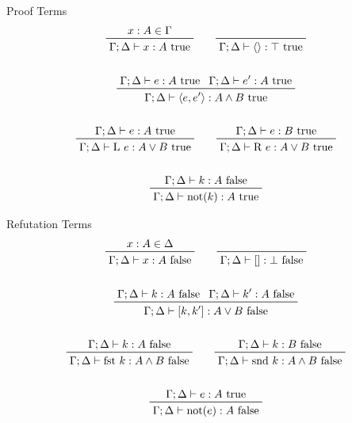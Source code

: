 \documentclass[11pt]{article}
\begin{document}
{{        \begin{minipage}[t]{0.49\textwidth}
        \footnotesize
        \centering
        Proof Terms
        \begin{gather*}
        \prftree[r]{}
        {x:A\in\Gamma}
        {\Gamma;\Delta\vdash x:A\text{ true}}
        \qquad
        \prftree[r]{}
        {\Gamma;\Delta\vdash \langle\rangle:\top\text{ true}}
        \\
        \\
        \prftree[r]{}
        {\Gamma;\Delta\vdash e :A\text{ true}}
        {\Gamma;\Delta\vdash e' :A\text{ true}}
        {\Gamma;\Delta\vdash \langle e,e' \rangle :A \wedge B\text{ true}}
        \\
        \\
        \prftree[r]{}
        {\Gamma;\Delta\vdash e:A\text{ true}}
        {\Gamma;\Delta\vdash \text{L }e:A \vee B\text{ true}}
        \qquad
        \prftree[r]{}
        {\Gamma;\Delta\vdash e:B\text{ true}}
        {\Gamma;\Delta\vdash \text{R }e:A \vee B\text{ true}}
        \\
        \\
        \prftree[r]{}
        {\Gamma;\Delta\vdash k:A\text{ false}}
        {\Gamma;\Delta\vdash \text{not}(k):A\text{ true}}
        \\
        \end{gather*}
        \end{minipage}
        \begin{minipage}[t]{0.49\textwidth}
        \footnotesize
        \centering
        Refutation Terms
        \begin{gather*}
        \prftree[r]{}
        {x:A\in\Delta}
        {\Gamma;\Delta\vdash x:A\text{ false}}
        \qquad
        \prftree[r]{}
        {\Gamma;\Delta\vdash []:\bot\text{ false}}
        \\
        \\
        \prftree[r]{}
        {\Gamma;\Delta\vdash k :A\text{ false}}
        {\Gamma;\Delta\vdash k' :A\text{ false}}
        {\Gamma;\Delta\vdash [k,k'] :A \vee B \text{ false}}
        \\
        \\
        \prftree[r]{}
        {\Gamma;\Delta\vdash k:A\text{ false}}
        {\Gamma;\Delta\vdash \text{fst }k:A \wedge B\text{ false}}
        \qquad
        \prftree[r]{}
        {\Gamma;\Delta\vdash k:B\text{ false}}
        {\Gamma;\Delta\vdash \text{snd }k:A \wedge B\text{ false}}
        \\
        \\
        \prftree[r]{}
        {\Gamma;\Delta\vdash e:A\text{ true}}
        {\Gamma;\Delta\vdash \text{not}(e):A\text{ false}}
        \\
        \end{gather*}
        \end{minipage}

}}
\end{document}
